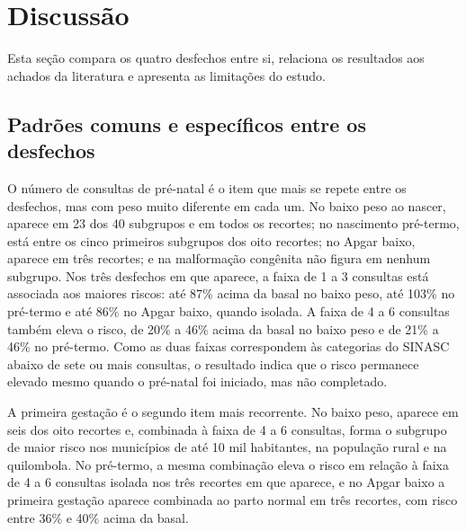 
\section{Discussão}\label{sec:discussao}

Esta seção compara os quatro desfechos entre si, relaciona os resultados aos achados da literatura e apresenta as limitações do estudo.

\subsection{Padrões comuns e específicos entre os desfechos}\label{subsec:disc-padroes}

O número de consultas de pré-natal é o item que mais se repete entre os desfechos, mas com peso muito diferente em cada um. No baixo peso ao nascer, aparece em 23 dos 40 subgrupos e em todos os recortes; no nascimento pré-termo, está entre os cinco primeiros subgrupos dos oito recortes; no Apgar baixo, aparece em três recortes; e na malformação congênita não figura em nenhum subgrupo. Nos três desfechos em que aparece, a faixa de 1 a 3 consultas está associada aos maiores riscos: até 87\% acima da basal no baixo peso, até 103\% no pré-termo e até 86\% no Apgar baixo, quando isolada. A faixa de 4 a 6 consultas também eleva o risco, de 20\% a 46\% acima da basal no baixo peso e de 21\% a 46\% no pré-termo. Como as duas faixas correspondem às categorias do SINASC abaixo de sete ou mais consultas, o resultado indica que o risco permanece elevado mesmo quando o pré-natal foi iniciado, mas não completado.

A primeira gestação é o segundo item mais recorrente. No baixo peso, aparece em seis dos oito recortes e, combinada à faixa de 4 a 6 consultas, forma o subgrupo de maior risco nos municípios de até 10 mil habitantes, na população rural e na quilombola. No pré-termo, a mesma combinação eleva o risco em relação à faixa de 4 a 6 consultas isolada nos três recortes em que aparece, e no Apgar baixo a primeira gestação aparece combinada ao parto normal em três recortes, com risco entre 36\% e 40\% acima da basal.

